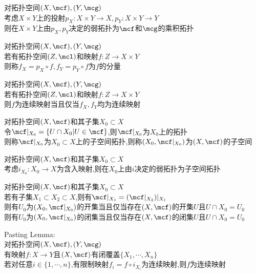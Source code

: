 \begin{dingli}
对拓扑空间$(X,\mcf),(Y,\mcg)$\\
考虑$X\times Y$上的投射$p_{X}:X\times Y\to X,p_{Y}:X\times Y\to Y$\\
则在$X\times Y$上由$p_{X},p_{Y}$决定的弱拓扑为$\mcf$和$\mcg$的乘积拓扑
\end{dingli}

\begin{dingyi}
对拓扑空间$(X,\mcf),(Y,\mcg)$\\
若有拓扑空间$(Z,\mcl)$和映射$f:Z\to X\times Y$\\
则称$f_{X}=p_{X}\circ f,f_{Y}=p_{Y}\circ f$为$f$的分量
\end{dingyi}

\begin{dingli}
对拓扑空间$(X,\mcf),(Y,\mcg)$\\
若有拓扑空间$(Z,\mcl)$和映射$f:Z\to X\times Y$\\
则$f$为连续映射当且仅当$f_{X},f_{Y}$均为连续映射
\end{dingli}

\begin{dingyi}
对拓扑空间$(X,\mcf)$和其子集$X_0\subset X$\\
令$\mcf|_{X_0}=\{U\cap X_0|U\in \mcf\}$,则$\mcf|_{X_0}$为$X_0$上的拓扑\\
则称$\mcf|_{X_0}$为$X_0\subset X$上的子空间拓扑,则称$(X_0,\mcf|_{X_0})$为$(X,\mcf)$的子空间
\end{dingyi}

\begin{dingli}
对拓扑空间$(X,\mcf)$和其子集$X_0\subset X$\\
考虑$i_{X_0}:X_0\to X$为含入映射,则在$X_0$上由$i$决定的弱拓扑为子空间拓扑
\end{dingli}

\begin{dingli}
对拓扑空间$(X,\mcf)$和其子集$X_0\subset X$\\
若有子集$X_1\subset X_2\subset X$,则有$\mcf|_{X_1}=(\mcf|_{X_2})|_{X_1}$\\
则有$U_0$为$(X_0,\mcf|_{X_0})$的开集当且仅当存在$(X,\mcf)$的开集$U$且$U\cap X_0=U_0$\\
则有$U_0$为$(X_0,\mcf|_{X_0})$的闭集当且仅当存在$(X,\mcf)$的闭集$U$且$U\cap X_0=U_0$
\end{dingli}

\begin{dingli}
Pasting Lemma:\\
对拓扑空间$(X,\mcf),(Y,\mcg)$\\
有映射$f:X\to Y$且$(X,\mcf)$有闭覆盖$\{X_1,\cdots,X_n\}$\\
若对任意$i\in\{1,\cdots,n\}$,有限制映射$f_i=f\circ i_{X_i}$为连续映射,则$f$为连续映射
\end{dingli}


